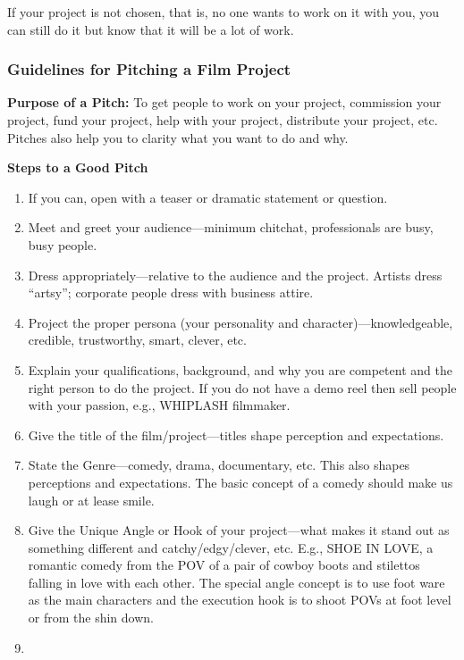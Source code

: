 \documentclass[
  letterpaper,
  DIV=11,
  numbers=noendperiod]{scrreprt}
\providecommand{\tightlist}{%
  \setlength{\itemsep}{0pt}\setlength{\parskip}{0pt}}\usepackage{longtable,booktabs,array}
\begin{document}
\begin{tcolorbox}
If your project is not chosen, that is, no one wants to work on it with
you, you can still do it but know that it will be a lot of work.

\subsubsection{Guidelines for Pitching a Film
Project}\label{guidelines-for-pitching-a-film-project}

\textbf{Purpose of a Pitch:} To get people to work on your project,
commission your project, fund your project, help with your project,
distribute your project, etc. Pitches also help you to clarity what you
want to do and why.

\textbf{Steps to a Good Pitch}

\begin{enumerate}
\def\labelenumi{\arabic{enumi}.}
\tightlist
\item
  If you can, open with a teaser or dramatic statement or question.
\item
  Meet and greet your audience---minimum chitchat, professionals are
  busy, busy people.
\item
  Dress appropriately---relative to the audience and the project.
  Artists dress ``artsy''; corporate people dress with business attire.
\item
  Project the proper persona (your personality and
  character)---knowledgeable, credible, trustworthy, smart, clever, etc.
\item
  Explain your qualifications, background, and why you are competent and
  the right person to do the project. If you do not have a demo reel
  then sell people with your passion, e.g., WHIPLASH filmmaker.
\item
  Give the title of the film/project---titles shape perception and
  expectations.
\item
  State the Genre---comedy, drama, documentary, etc. This also shapes
  perceptions and expectations. The basic concept of a comedy should
  make us laugh or at lease smile.
\item
  Give the Unique Angle or Hook of your project---what makes it stand
  out as something different and catchy/edgy/clever, etc. E.g., SHOE IN
  LOVE, a romantic comedy from the POV of a pair of cowboy boots and
  stilettos falling in love with each other. The special angle concept
  is to use foot ware as the main characters and the execution hook is
  to shoot POVs at foot level or from the shin down.
\item

\end{enumerate}
\end{tcolorbox}
\end{document}
